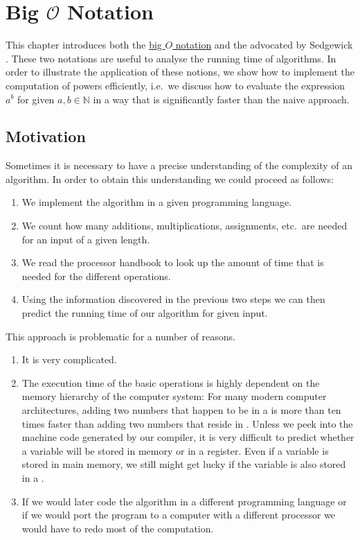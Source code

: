 \chapter{Big $\mathcal{O}$ Notation} 
This chapter introduces both the
\href{http://en.wikipedia.org/wiki/O_notation}{big $O$ notation} and the
 advocated by Sedgewick \cite{sedgewick:11}.
These two notations are useful to analyse the running time of algorithms.  In order to illustrate
the application of these notions, we show how to implement the computation of powers efficiently,
i.e.~we discuss how to evaluate the expression $a^b$ for given $a,b \in \mathbb{N}$ in a way that
is significantly faster than the naive approach. 
\section{Motivation}
Sometimes it is necessary to have a precise understanding of the complexity of an algorithm.  
In order to obtain this understanding we could proceed as follows:  
\begin{enumerate}
\item We implement the algorithm in a given programming language.
\item We count how many additions, multiplications, assignments, etc.~are needed
      for an input of a given length.
\item We read the processor handbook to look up the amount of time that is needed for the different operations.
\item Using the information discovered in the previous two steps we can then predict the running
      time of our algorithm for given input.
\end{enumerate}
This approach is problematic for a number of reasons.
\begin{enumerate}
\item It is very complicated.
\item The execution time of the basic operations is highly dependent on the memory hierarchy of the
      computer system:  For many modern computer architectures, adding two numbers that happen to be
      in a  is more than ten times faster than adding two numbers that reside in
      .  Unless we peek into the machine code generated by our compiler, it is very difficult
      to predict whether a variable will be stored in memory or in a register.  Even if a variable
      is stored in main memory, we still might get lucky if the variable is also stored in a .
\item If we would later code the algorithm in a different programming language or if we would port
      the program to a computer with a different processor we would have to redo most of the
      computation. 
\end{enumerate}
